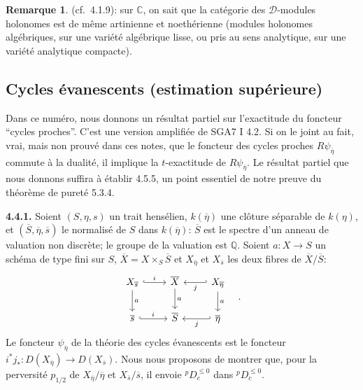 \documentclass[12pt,a4paper]{article}
\theoremstyle{plain}
\theoremstyle{definition}
\newtheorem{remark}[theorem]{Remarque}
\begin{document}
\begin{remark}\label{rem:4.3.5}
(cf.\ 4.1.9): sur $\mathbb{C}$, on sait que la cat\'{e}gorie des $\mathcal{D}$-modules holonomes est de m\^{e}me artinienne et noeth\'{e}rienne (modules holonomes alg\'{e}briques, sur une vari\'{e}t\'{e} alg\'{e}brique lisse, ou pris au sens analytique, sur une vari\'{e}t\'{e} analytique compacte).
\end{remark}

\subsection{Cycles \'{e}vanescents (estimation sup\'{e}rieure)}

Dans ce num\'{e}ro, nous donnons un r\'{e}sultat partiel sur l'exactitude du foncteur ``cycles proches''. C'est une version amplifi\'{e}e de SGA7 I 4.2. Si on le joint au fait, vrai, mais non prouv\'{e} dans ces notes, que le foncteur des cycles proches $R\psi_{\overline{\eta}}$ commute \`{a} la dualit\'{e}, il implique la $t$-exactitude de $R\psi_{\overline{\eta}}$. Le r\'{e}sultat partiel que nous donnons suffira \`{a} \'{e}tablir 4.5.5, un point essentiel de notre preuve du th\'{e}or\`{e}me de puret\'{e} 5.3.4.

\noindent\textbf{4.4.1.} Soient $(S,\eta,s)$ un trait hens\'{e}lien, $k(\overline{\eta})$ une cl\^{o}ture s\'{e}parable de $k(\eta)$, et $(\overline{S},\overline{\eta},\overline{s})$ le normalis\'{e} de $S$ dans $k(\overline{\eta})$: $\overline{S}$ est le spectre d'un anneau de valuation non discr\`{e}te; le groupe de la valuation est $\mathbb{Q}$. Soient $a: X \longrightarrow S$ un sch\'{e}ma de type fini sur $S$, $\overline{X} = X \times_{S} \overline{S}$ et $X_{\overline{\eta}}$ et $X_{\overline{s}}$ les deux fibres de $\overline{X}/\overline{S}$:
\[
\begin{tikzcd}
X_{\overline{s}} \rar[hook]{i} \dar{a} & \overline{X} \dar{a} & X_{\overline{\eta}} \lar[hook']{j} \dar{a} \\
\overline{s} \rar[hook]{i} & \overline{S} & \overline{\eta} \lar[hook']{j}
\end{tikzcd}
\quad.
\]
Le foncteur $\psi_{\overline{\eta}}$ de la th\'{e}orie des cycles \'{e}vanescents est le foncteur $i^{*}j_{*}: D(X_{\overline{\eta}}) \longrightarrow D(X_{\overline{s}})$. Nous nous proposons de montrer que, pour la perversit\'{e} $p_{1/2}$ de $X_{\overline{\eta}}/\overline{\eta}$ et $X_{\overline{s}}/\overline{s}$, il envoie ${}^{p}D_{c}^{\leq 0}$ dans ${}^{p}D_{c}^{\leq 0}$.
\end{document}
